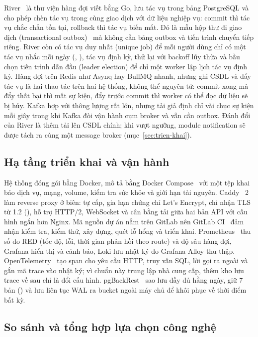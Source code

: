 River~\cite{river} là thư viện hàng đợi viết bằng Go, lưu tác vụ trong bảng PostgreSQL và cho phép chèn tác vụ trong cùng giao dịch với dữ liệu nghiệp vụ: commit thì tác vụ chắc chắn tồn tại, rollback thì tác vụ biến mất. Đó là mẫu hộp thư đi giao dịch (transactional outbox)~\cite{richardson} mà không cần bảng outbox và tiến trình chuyển tiếp riêng. River còn có tác vụ duy nhất (unique job) để mỗi người dùng chỉ có một tác vụ nhắc mỗi ngày (, ), tác vụ định kỳ, thử lại với backoff lũy thừa và bầu chọn tiến trình dẫn đầu (leader election) để chỉ một worker lập lịch tác vụ định kỳ. Hàng đợi trên Redis như Asynq hay BullMQ nhanh, nhưng ghi CSDL và đẩy tác vụ là hai thao tác trên hai hệ thống, không thể nguyên tử: commit xong mà đẩy thất bại thì mất sự kiện, đẩy trước commit thì worker có thể đọc dữ liệu sẽ bị hủy. Kafka hợp với thông lượng rất lớn, nhưng tải giả định chỉ vài chục sự kiện mỗi giây trong khi Kafka đòi vận hành cụm broker và vẫn cần outbox. Đánh đổi của River là thêm tải lên CSDL chính; khi vượt ngưỡng, module notification sẽ được tách ra cùng một message broker (mục~\ref{sec:trien-khai}).

\subsection{Hạ tầng triển khai và vận hành}\label{ssec:cn-ha-tang}

Hệ thống đóng gói bằng Docker, mô tả bằng Docker Compose~\cite{docker} với một tệp khai báo dịch vụ, mạng, volume, kiểm tra sức khỏe và giới hạn tài nguyên. Caddy~\cite{caddy} 2 làm reverse proxy ở biên: tự cấp, gia hạn chứng chỉ Let's Encrypt, chỉ nhận TLS từ 1.2 (), hỗ trợ HTTP/2, WebSocket và cân bằng tải giữa hai bản API với cấu hình ngắn hơn Nginx. Mã nguồn dự án nằm trên GitLab nên GitLab CI~\cite{gitlabci} đảm nhận kiểm tra, kiểm thử, xây dựng, quét lỗ hổng và triển khai. Prometheus~\cite{prometheus} thu số đo RED (tốc độ, lỗi, thời gian phản hồi theo route) và độ sâu hàng đợi, Grafana hiển thị và cảnh báo, Loki lưu nhật ký do Grafana Alloy thu thập. OpenTelemetry~\cite{opentelemetry} tạo span cho yêu cầu HTTP, truy vấn SQL, lời gọi ra ngoài và gắn mã trace vào nhật ký; vì chuẩn này trung lập nhà cung cấp, thêm kho lưu trace về sau chỉ là đổi cấu hình. pgBackRest~\cite{pgbackrest} sao lưu đầy đủ hằng ngày, giữ 7 bản () và lưu liên tục WAL ra bucket ngoài máy chủ để khôi phục về thời điểm bất kỳ.

\subsection{So sánh và tổng hợp lựa chọn công nghệ}\label{ssec:cn-so-sanh}

